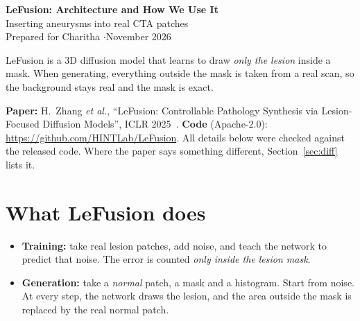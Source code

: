 \documentclass[11pt,a4paper]{article}
\begin{document}
\begin{center}
{\LARGE\bfseries\color{ink} LeFusion: Architecture and How We Use It}\\[6pt]
{\large Inserting aneurysms into real CTA patches}\\[6pt]
{\small Prepared for Charitha \quad$\cdot$\quad November 2026}
\end{center}

\begin{idea}
LeFusion is a 3D diffusion model that learns to draw \emph{only the lesion} inside a mask. When generating, everything outside the mask is taken from a real scan, so the background stays real and the mask is exact.
\end{idea}

\textbf{Paper:} H.~Zhang \emph{et al.}, ``LeFusion: Controllable Pathology Synthesis via Lesion-Focused Diffusion Models'', ICLR 2025~\cite{lefusion}.
\textbf{Code} (Apache-2.0): \url{https://github.com/HINTLab/LeFusion}.
All details below were checked against the released code. Where the paper says something different, Section~\ref{sec:diff} lists it.

\tableofcontents

\section{What LeFusion does}
\begin{itemize}
  \item \textbf{Training:} take real lesion patches, add noise, and teach the network to predict that noise. The error is counted \emph{only inside the lesion mask}.
  \item \textbf{Generation:} take a \emph{normal} patch, a mask and a histogram. Start from noise. At every step, the network draws the lesion, and the area outside the mask is replaced by the real normal patch.
\end{itemize}
\end{document}
